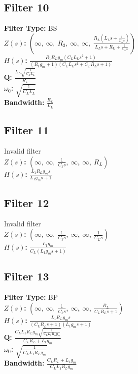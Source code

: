 \documentclass{article}
\begin{document}
\subsection*{Filter 10}
\textbf{Filter Type:} BS \\ 
\textbf{$Z(s)$:} $\left( \infty, \  \infty, \  R_{3}, \  \infty, \  \infty, \  \frac{R_{L} \left(L_{L} s + \frac{1}{C_{L} s}\right)}{L_{L} s + R_{L} + \frac{1}{C_{L} s}}\right)$ \\ 
\textbf{$H(s)$:} $\frac{R_{1} R_{L} g_{m} \left(C_{L} L_{L} s^{2} + 1\right)}{\left(R_{1} g_{m} + 1\right) \left(C_{L} L_{L} s^{2} + C_{L} R_{L} s + 1\right)}$ \\ 
\textbf{Q:} $\frac{L_{L} \sqrt{\frac{1}{C_{L} L_{L}}}}{R_{L}}$ \\ 
\textbf{$\omega_0$:} $\sqrt{\frac{1}{C_{L} L_{L}}}$ \\ 
\textbf{Bandwidth:} $\frac{R_{L}}{L_{L}}$ \\ 
\subsection*{Filter 11}
Invalid filter \\ 
\textbf{$Z(s)$:} $\left( \infty, \  \infty, \  \frac{1}{C_{3} s}, \  \infty, \  \infty, \  R_{L}\right)$ \\ 
\textbf{$H(s)$:} $\frac{L_{1} R_{L} g_{m} s}{L_{1} g_{m} s + 1}$ \\ 
\subsection*{Filter 12}
Invalid filter \\ 
\textbf{$Z(s)$:} $\left( \infty, \  \infty, \  \frac{1}{C_{3} s}, \  \infty, \  \infty, \  \frac{1}{C_{L} s}\right)$ \\ 
\textbf{$H(s)$:} $\frac{L_{1} g_{m}}{C_{L} \left(L_{1} g_{m} s + 1\right)}$ \\ 
\subsection*{Filter 13}
\textbf{Filter Type:} BP \\ 
\textbf{$Z(s)$:} $\left( \infty, \  \infty, \  \frac{1}{C_{3} s}, \  \infty, \  \infty, \  \frac{R_{L}}{C_{L} R_{L} s + 1}\right)$ \\ 
\textbf{$H(s)$:} $\frac{L_{1} R_{L} g_{m} s}{\left(C_{L} R_{L} s + 1\right) \left(L_{1} g_{m} s + 1\right)}$ \\ 
\textbf{Q:} $\frac{C_{L} L_{1} R_{L} g_{m} \sqrt{\frac{1}{C_{L} L_{1} R_{L} g_{m}}}}{C_{L} R_{L} + L_{1} g_{m}}$ \\ 
\textbf{$\omega_0$:} $\sqrt{\frac{1}{C_{L} L_{1} R_{L} g_{m}}}$ \\ 
\textbf{Bandwidth:} $\frac{C_{L} R_{L} + L_{1} g_{m}}{C_{L} L_{1} R_{L} g_{m}}$ \\ 
\end{document}

